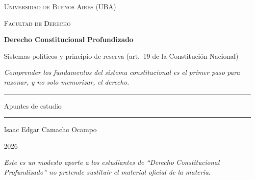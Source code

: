 \documentclass[12pt,oneside]{book}
\newcommand{\universidad}{Universidad de Buenos Aires (UBA)}
\newcommand{\facultad}{Facultad de Derecho}
\newcommand{\materia}{Derecho Constitucional Profundizado}
\newcommand{\titulo}{Sistemas políticos y principio de reserva (art.\ 19 de la Constitución Nacional)}
\newcommand{\autor}{Isaac Edgar Camacho Ocampo}
\newcommand{\anio}{2026}
\begin{document}
\begin{titlepage}
\thispagestyle{empty}

\begin{center}

\vspace*{1cm}

{\large \textsc{\universidad}}

\vspace{0.2cm}

{\large \textsc{\facultad}}

\vspace{3cm}

{\Huge \textbf{\materia}}

\vspace{1cm}

{\LARGE \titulo}

\vspace{0.8cm}

\textit{Comprender los fundamentos del sistema constitucional es el primer paso para razonar, y no solo memorizar, el derecho.}

\vspace{1.2cm}

\rule{0.70\textwidth}{0.5pt}

\vspace{0.5cm}

{\large Apuntes de estudio}

\vspace{0.5cm}

\rule{0.70\textwidth}{0.5pt}

\vfill

{\large \autor}

\vspace{0.3cm}

{\large \anio}

\end{center}

\vfill

\begin{flushleft}
\textit{Este es un modesto aporte a los estudiantes de ``Derecho Constitucional Profundizado'' no pretende sustituir el material oficial de la materia.}
\end{flushleft}

\end{titlepage}

\tableofcontents
\end{document}
